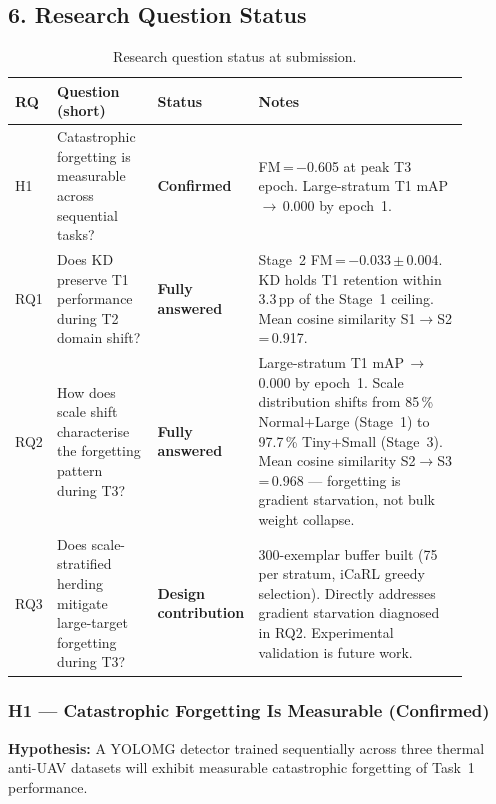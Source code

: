 \subsection*{6. Research Question Status}

\begin{table}[h]
\centering
\caption{Research question status at submission.}
\small
\begin{tabular}{p{0.08\linewidth}p{0.22\linewidth}p{0.14\linewidth}p{0.46\linewidth}}
\hline
\textbf{RQ} & \textbf{Question (short)} & \textbf{Status} & \textbf{Notes} \\
\hline
H1 &
Catastrophic forgetting is measurable across sequential tasks? &
\textbf{Confirmed} &
FM\,=\,$-$0.605 at peak T3 epoch. Large-stratum T1 mAP\,$\to$\,0.000 by epoch~1. \\[4pt]

RQ1 &
Does KD preserve T1 performance during T2 domain shift? &
\textbf{Fully answered} &
Stage~2 FM\,=\,$-$0.033\,$\pm$\,0.004. KD holds T1 retention within
3.3\,pp of the Stage~1 ceiling. Mean cosine similarity S1$\to$S2\,=\,0.917. \\[4pt]

RQ2 &
How does scale shift characterise the forgetting pattern during T3? &
\textbf{Fully answered} &
Large-stratum T1 mAP\,$\to$\,0.000 by epoch~1. Scale distribution
shifts from 85\,\% Normal+Large (Stage~1) to 97.7\,\% Tiny+Small
(Stage~3). Mean cosine similarity S2$\to$S3\,=\,0.968 — forgetting
is gradient starvation, not bulk weight collapse. \\[4pt]

RQ3 &
Does scale-stratified herding mitigate large-target forgetting during T3? &
\textbf{Design contribution} &
300-exemplar buffer built (75 per stratum, iCaRL greedy selection).
Directly addresses gradient starvation diagnosed in RQ2.
Experimental validation is future work. \\
\hline
\end{tabular}
\end{table}

\subsubsection*{H1 — Catastrophic Forgetting Is Measurable (Confirmed)}

\textbf{Hypothesis:} A YOLOMG detector trained sequentially across three
thermal anti-UAV datasets will exhibit measurable catastrophic forgetting
of Task~1 performance.


